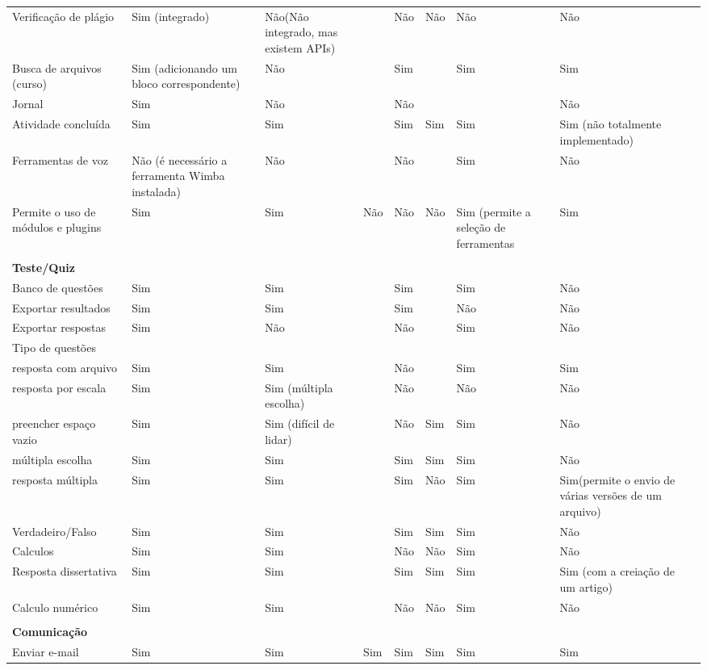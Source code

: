 \begin{table}[!htb]
\begin{tabular}{@{}p{5cm}|p{4cm}|p{4cm}|p{4cm}|p{4cm}|p{4cm}|p{4cm}|p{4cm}|p{4cm}@{}}
Verificação de plágio & Sim (integrado) & Não(Não integrado, mas existem APIs) &  & Não & Não & Não & Não &  \\
Busca de arquivos (curso) & Sim (adicionando um bloco correspondente) & Não &  & Sim &  & Sim & Sim &  \\
Jornal & Sim & Não &  & Não &  &  & Não &  \\
Atividade concluída & Sim & Sim &  & Sim & Sim & Sim & Sim (não totalmente implementado) &  \\
Ferramentas de voz & Não (é necessário a ferramenta Wimba instalada) & Não &  & Não &  & Sim & Não &  \\
Permite o uso de módulos e plugins & Sim & Sim & Não & Não & Não & Sim (permite a seleção de ferramentas & Sim &  \\
 &  &  &  &  &  &  &  &  \\
\textbf{Teste/Quiz} &  &  &  &  &  &  &  &  \\
Banco de questões & Sim & Sim &  & Sim &  & Sim & Não &  \\
Exportar resultados & Sim & Sim &  & Sim &  & Não & Não &  \\
Exportar respostas & Sim & Não &  & Não &  & Sim & Não &  \\
Tipo de questões &  &  &  &  &  &  &  &  \\
resposta com arquivo & Sim & Sim &  & Não &  & Sim & Sim &  \\
resposta por escala & Sim & Sim (múltipla escolha) &  & Não &  & Não & Não &  \\
preencher espaço vazio & Sim & Sim (difícil de lidar) &  & Não & Sim & Sim & Não &  \\
múltipla escolha & Sim & Sim &  & Sim & Sim & Sim & Não &  \\
resposta múltipla & Sim & Sim &  & Sim & Não & Sim & Sim(permite o envio de várias versões de um arquivo) &  \\
Verdadeiro/Falso & Sim & Sim &  & Sim & Sim & Sim & Não &  \\
Calculos & Sim & Sim &  & Não & Não & Sim & Não &  \\
Resposta dissertativa & Sim & Sim &  & Sim & Sim & Sim & Sim (com a creiação de um artigo) &  \\
Calculo numérico & Sim & Sim &  & Não & Não & Sim & Não &  \\
 &  &  &  &  &  &  &  &  \\
\textbf{Comunicação} &  &  &  &  &  &  &  &  \\
Enviar e-mail & Sim & Sim & Sim & Sim & Sim & Sim & Sim &  \\

\end{tabular}
\end{table}
